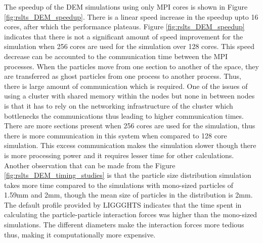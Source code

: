 \documentclass[preprint,11pt,authoryear]{elsarticle}
\begin{document}
The speedup of the DEM simulations using only MPI cores is shown in Figure \ref{fig:rslts_DEM_speedup}.
There is a linear speed increase in the speedup upto 16 cores, after which the performance plateaus.
Figure \ref{fig:rslts_DEM_speedup} indicates that there 
is not a significant amount of speed improvement for the simulation when 256 cores are used for the 
simulation over 128 cores. This speed decrease can be accounted to the communication time between 
the MPI processes. When the particles move from one section to another of the space, they are 
transferred as ghost particles from one process to another process. Thus, there is large amount of 
communication which is required. One of the issues of using a cluster with shared memory within 
the nodes but none in between nodes is that it has to rely on the networking infrastructure 
of the cluster which bottlenecks the communications thus leading to higher communication times. 
There are more sections present when 256 cores are used for the 
simulation, thus there is more communication in this system when compared to 128 core simulation. 
This excess communication makes the simulation slower though there is more processing power and 
it requires lesser time for other calculations. Another observation that can be made from the Figure 
\ref{fig:rslts_DEM_timing_studies} is that the particle size distribution simulation takes more time 
compared to the simulations with mono-sized particles of 1.59mm and 2mm, though the mean size of 
particles in the distribution is 2mm. The default profile provided by LIGGGHTS indicates that the time 
spent in calculating the particle-particle interaction forces was higher than the mono-sized 
simulations. The different diameters make the interaction forces more tedious thus, making it 
computationally more expensive. 
\end{document}
